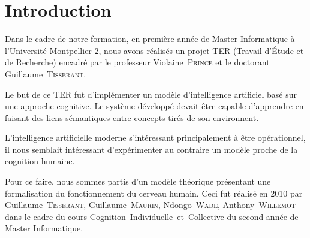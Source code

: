 \chapter*{Introduction}
Dans le cadre de notre formation, en première année de Master Informatique à l'Université Montpellier 2, nous avons réalisés un projet TER (Travail d'Étude et de Recherche) encadré par le professeur \mbox{Violaine \textsc{Prince}} et le doctorant \mbox{Guillaume \textsc{Tisserant}}.

Le but de ce TER fut d'implémenter un modèle d'intelligence artificiel basé sur une approche cognitive. Le système développé devait être capable d'apprendre en faisant des liens sémantiques entre concepts tirés de son environnent. 

L'intelligence artificielle moderne s'intéressant principalement à être
opérationnel, il nous semblait intéressant d'expérimenter au contraire un modèle proche de la cognition humaine.

Pour ce faire, nous sommes partis d'un modèle théorique présentant une formalisation du fonctionnement du cerveau humain. Ceci fut réalisé en 2010 par \mbox{Guillaume \textsc{Tisserant}}, \mbox{Guillaume \textsc{Maurin}}, \mbox{Ndongo \textsc{Wade}}, \mbox{Anthony \textsc{Willemot}} dans le cadre du cours \mbox{\og Cognition Individuelle et Collective\fg{}} du second année de Master Informatique.


